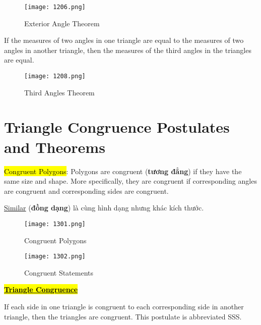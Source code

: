 \begin{figure}[htb!]
  \centering
  \texttt{[image: 1206.png]}
  \caption{Exterior Angle Theorem}
\end{figure}

\newpage

\begin{tcolorbox}[colback=Red!5!white,colframe=Red!75!black,title=Third Angles Theorem (unimportant)]
  If the measures of two angles in one triangle are equal to the measures of two angles in another triangle, then the measures of the third angles in the triangles are equal.
\end{tcolorbox}

\begin{figure}[htb!]
  \centering
  \texttt{[image: 1208.png]}
  \caption{Third Angles Theorem}
\end{figure}

\section{Triangle Congruence Postulates and Theorems}

\hl{Congruent Polygons}: Polygons are congruent (\textbf{tương đẳng}) if they have the same size and shape. More specifically, they are congruent if corresponding angles are congruent and corresponding sides are congruent.

\href{https://en.wikipedia.org/wiki/Similarity_(geometry)}{Similar} (\textbf{đồng dạng}) là cùng hình dạng nhưng khác kích thước.

\begin{figure}[htb!]
  \centering
  \texttt{[image: 1301.png]}
  \caption{Congruent Polygons}
\end{figure}

\begin{figure}[htb!]
  \centering
  \texttt{[image: 1302.png]}
  \caption{Congruent Statements}
\end{figure}

\newpage

\centerline{\underline{\hl{\textbf{\huge Triangle Congruence}}}}

\vspace{.5cm}

\begin{tcolorbox}[colback=RoyalPurple!5!white,colframe=RoyalPurple!75!black,title=Side-Side-Side Congruence Postulate]
  If each side in one triangle is congruent to each corresponding side in another triangle, then the triangles are congruent. This postulate is abbreviated SSS.
\end{tcolorbox}

